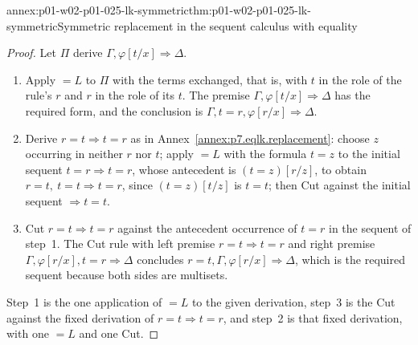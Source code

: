 \begin{annexitem}{annex:p01-w02-p01-025-lk-symmetric}{thm:p01-w02-p01-025-lk-symmetric}{Symmetric replacement in the sequent calculus with equality}
\begin{proof}
Let \(\Pi\) derive \(\Gamma,\varphi[t/x]\Rightarrow\Delta\).
\begin{enumerate}
 \item Apply \(=L\) to \(\Pi\) with the terms exchanged, that is, with
 \(t\) in the role of the rule's \(r\) and \(r\) in the role of its \(t\).
 The premise \(\Gamma,\varphi[t/x]\Rightarrow\Delta\) has the required
 form, and the conclusion is \(\Gamma,t=r,\varphi[r/x]\Rightarrow\Delta\).
 \item Derive \(r=t\Rightarrow t=r\) as in
 Annex~\ref{annex:p7.eqlk.replacement}: choose \(z\) occurring in neither
 \(r\) nor \(t\); apply \(=L\) with the formula \(t=z\) to the initial
 sequent \(t=r\Rightarrow t=r\), whose antecedent is \((t=z)[r/z]\), to
 obtain \(r=t,\ t=t\Rightarrow t=r\), since \((t=z)[t/z]\) is \(t=t\); then
 Cut against the initial sequent \(\Rightarrow t=t\).
 \item Cut \(r=t\Rightarrow t=r\) against the antecedent occurrence of
 \(t=r\) in the sequent of step~1.  The Cut rule with left premise
 \(r=t\Rightarrow t=r\) and right premise
 \(\Gamma,\varphi[r/x],t=r\Rightarrow\Delta\) concludes
 \(r=t,\Gamma,\varphi[r/x]\Rightarrow\Delta\), which is the required sequent
 because both sides are multisets.
\end{enumerate}
Step~1 is the one application of \(=L\) to the given derivation, step~3 is
the Cut against the fixed derivation of \(r=t\Rightarrow t=r\), and step~2
is that fixed derivation, with one \(=L\) and one Cut.
\end{proof}
\end{annexitem}

